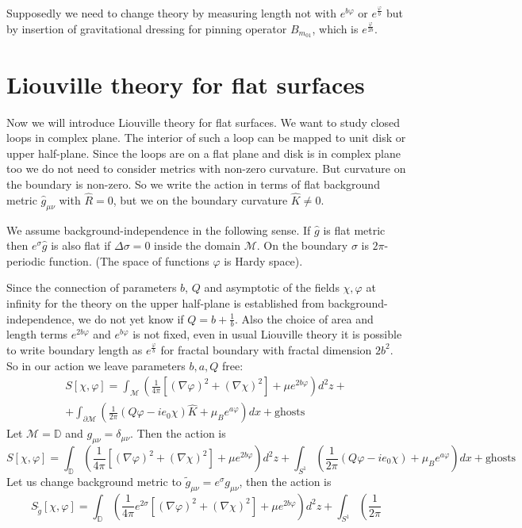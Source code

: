 \documentclass[12pt]{article}
\begin{document}
Supposedly we need to change theory by measuring length not with $e^{b\varphi}$ or
$e^{\frac{\varphi}{b}}$ but by insertion of gravitational dressing for pinning operator
$B_{m_{01}}$, which is $e^{\frac{\varphi}{2b}}$.

\section{Liouville theory for flat surfaces}
\label{sec:liouv-theory-flat}

Now we will introduce Liouville theory for flat surfaces. We want to study closed loops in complex
plane. The interior of such a loop can be mapped to unit disk or upper half-plane. Since the loops
are on a flat plane and disk is in complex plane too we do not need to consider metrics with
non-zero curvature. But curvature on the boundary is non-zero. So we write the action in terms of
flat background metric $\hat g_{\mu\nu}$ with $\hat R=0$, but we on the boundary curvature $\hat
K\neq 0$.

We assume background-independence in the following sense. If $\hat g$ is flat metric then
$e^{\sigma}\hat g$ is also flat if $\Delta\sigma=0$ inside the domain $\mathcal{M}$. On the boundary
$\sigma$ is $2\pi$-periodic function. (The space of functions ${\varphi}$ is Hardy space). 

Since the connection of parameters $b$, $Q$ and asymptotic of the fields $\chi, \varphi$ at infinity
for the theory on the upper half-plane is established from background-independence, we do not yet
know if $Q=b+\frac{1}{b}$. Also the choice of area and length terms $e^{2b\varphi}$ and
$e^{b\varphi}$ is not fixed,  even in usual Liouville theory it is possible to write boundary length
as $e^{\frac{\varphi}{b}}$ for fractal boundary with fractal dimension $2b^{2}$. So in our action we
leave parameters $b,a,Q$ free:
\begin{multline}
\label{eq:181}
  S[\chi,\varphi]=\int_{\mathcal{M}}\left(\frac{1}{4\pi}[(\nabla \varphi)^{2}+(\nabla
    \chi)^{2}]+\mu e^{2b\varphi}\right)d^{2}z +\\
  +  \int_{\partial
    \mathcal{M}}\left(\frac{1}{2\pi}(Q\varphi-ie_{0}\chi)\hat K + \mu_{B}e^{a\varphi}\right)dx+\mbox{ghosts}
\end{multline}
Let $\mathcal{M}=\mathbb{D}$ and $g_{\mu\nu}=\delta_{\mu\nu}$. Then the action is
\begin{equation}
  \label{eq:182}
   S[\chi,\varphi]=\int_{\mathbb{D}}\left(\frac{1}{4\pi}[(\nabla \varphi)^{2}+(\nabla
    \chi)^{2}]+\mu e^{2b\varphi}\right)d^{2}z +
    \int_{S^{1}} \left(\frac{1}{2\pi}(Q\varphi-ie_{0}\chi) + \mu_{B}e^{a\varphi}\right)dx+\mbox{ghosts}
\end{equation}
Let us change background metric to $\tilde g_{\mu\nu}=e^{\sigma}g_{\mu\nu}$, then the action is
\begin{equation}
  \label{eq:183}
  S_{\tilde g}[\chi,\varphi]=\int_{\mathbb{D}} \left( \frac{1}{4\pi} e^{2\sigma}\left[ (\nabla
      \varphi)^{2}+(\nabla \chi)^{2}\right] +\mu e^{2b\varphi}\right)d^{2}z +\int_{S^{1}} \left( \frac{1}{2\pi}
\end{equation}
\end{document}
